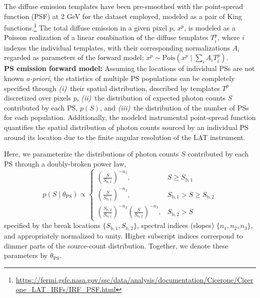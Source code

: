 \documentclass[prd,aps,10pt,nofootinbib,twocolumn,superscriptaddress,preprintnumbers,balancelastpage,longbibliography,floatfix]{revtex4-2}
\begin{document}
The diffuse emission templates have been pre-smoothed with the \Fermi point-spread function (PSF) at 2 GeV for the dataset employed, modeled as a pair of King functions.\footnote{\url{https://fermi.gsfc.nasa.gov/ssc/data/analysis/documentation/Cicerone/Cicerone_LAT_IRFs/IRF_PSF.html}} The total diffuse emission in a given pixel $p$, $x^p$, is modeled as a Poisson realization of a linear combination of the diffuse templates $T^p_i$, where $i$ indexes the individual templates, with their corresponding normalizations $A_i$ regarded as parameters of the forward model; $x^p \sim \mathrm{Pois}\left(x^p\mid\sum_i A_i T^p_i\right)$. \\ 

\noindent
\textbf{PS emission forward model:} Assuming the locations of individual PSs are not known \emph{a-priori}, the statistics of multiple PS populations can be completely specified through \emph{(i)}~their spatial distribution, described by templates $T^p$ discretized over pixels $p$, \emph{(ii)}~the distribution of expected photon counts $S$ contributed by each PS, $p(S)$, and \emph{(iii)}~the distribution of the number of PSs for each population.  Additionally, the modeled instrumental point-spread function quantifies the spatial distribution of photon counts sourced by an individual PS around its location due to the finite angular resolution of the LAT instrument.

Here, we parameterize the distributions of photon counts $S$ contributed by each PS through a doubly-broken power law,
\begin{equation}
\label{eq:scd_bpl}
p(S\mid\theta_\mathrm{PS})\propto \left\{\begin{array}{lc}
\left(\frac{S}{S_{\mathrm b, 1}}\right)^{-n_{1}}, & S \geq S_{\mathrm b, 1} \\
\left(\frac{S}{S_{\mathrm b, 1}}\right)^{-n_{2}}, & S_{\mathrm b, 1}>S \geq S_{\mathrm b, 2} \\
\left(\frac{S_{\mathrm b, 2}}{S_{\mathrm b, 1}}\right)^{-n_{2}}\left(\frac{S}{S_{\mathrm b, 2}}\right)^{-n_{3}}, & S_{\mathrm b, 2}>S
\end{array}\right.
\end{equation}
specified by the break locations $\{S_{\mathrm b, 1}, S_{\mathrm b, 2}\}$, spectral indices (slopes) $\{n_1, n_2, n_3\}$, and appropriately normalized to unity. Higher subscript indices correspond to dimmer parts of the source-count distribution. Together, we denote these parameters by $\theta_\mathrm{PS}$.
\end{document}
